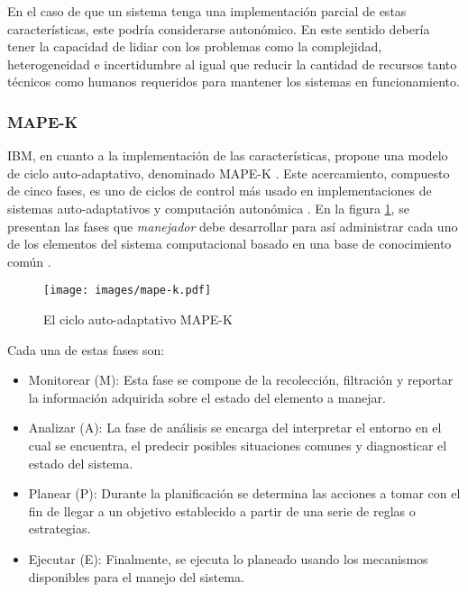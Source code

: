 En el caso de que un sistema tenga una implementación parcial de estas características, este podría considerarse autonómico. En este sentido debería tener la capacidad de lidiar con los problemas como la complejidad, heterogeneidad e incertidumbre \cite{emerging_2005} al igual que reducir la cantidad de recursos tanto técnicos como humanos requeridos para mantener los sistemas en funcionamiento.

\subsubsection{MAPE-K}


IBM, en cuanto a la implementación de las características, propone una modelo de ciclo auto-adaptativo, denominado MAPE-K \cite{Krikava2013}. Este acercamiento, compuesto de cinco fases, es uno de ciclos de control más usado en implementaciones de sistemas auto-adaptativos y computación autonómica \cite{Arcaini_2015}. En la figura \ref{fig:mapek}, se presentan las fases que \textit{manejador} debe desarrollar para así administrar cada uno de los elementos del sistema computacional basado en una base de conocimiento común \cite{alessandra_2010}. 

\begin{figure}[H]
    \centering
    \caption{El ciclo auto-adaptativo MAPE-K \protect\cite{alessandra_2010}} 
    \texttt{[image: images/mape-k.pdf]}
    \label{fig:mapek}
\end{figure}

Cada una de estas fases son:

\begin{itemize}
    \item Monitorear (M): Esta fase se compone de la recolección, filtración y reportar la información adquirida sobre el estado del elemento a manejar.
    \item Analizar (A): La fase de análisis se encarga del interpretar el entorno en el cual se encuentra, el predecir posibles situaciones comunes y diagnosticar el estado del sistema.
    \item Planear (P): Durante la planificación se determina las acciones a tomar con el fin de llegar a un objetivo establecido a partir de una serie de reglas o estrategias.
    \item Ejecutar (E): Finalmente, se ejecuta lo planeado usando los mecanismos disponibles para el manejo del sistema. 
\end{itemize}

